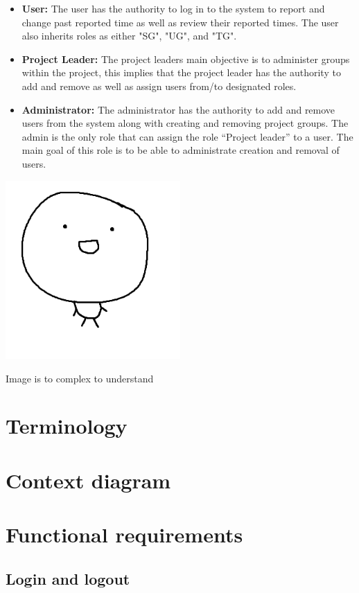 \documentclass{article}
\begin{document}
\begin{itemize}
  \item \textbf{User:} The user has the authority to log in to the system to report and  change past reported time as well as review their reported times. The user also inherits roles as either "SG", "UG", and "TG".
  \item \textbf{Project Leader:}
  The project leaders main objective is to administer groups within the project, this implies that the project leader has the authority to add and remove as well as assign users from/to designated roles.
   \item \textbf{Administrator:} The administrator has the authority to add and remove users from the system along with creating and removing project groups. The admin is the only role that can assign the role “Project leader” to a user. The main goal of this role is to be able to administrate creation and removal of users.
\end{itemize}

\includegraphics[width=0.5\textwidth]{Testbild.png}

\caption{Image is to complex to understand}

\section{Terminology}

\section{Context diagram}

\section{Functional requirements}
\subsection{Login and logout}
\end{document}
